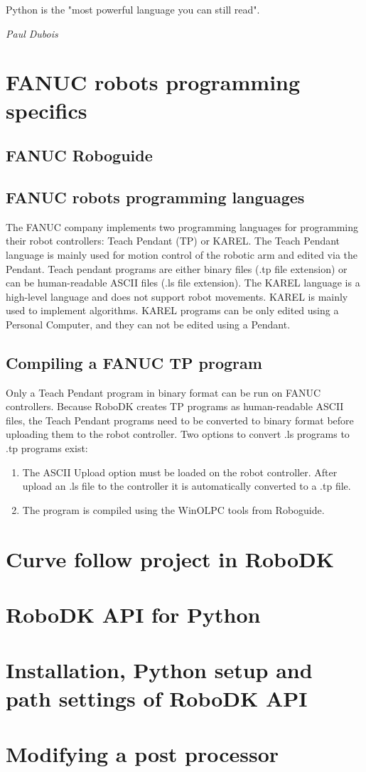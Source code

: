 \label{chap:implementation}

\epigraph{Python is the "most powerful language you can still read".}{\textit{Paul Dubois}}

\section{FANUC robots programming specifics}

\subsection{FANUC Roboguide}



\subsection{FANUC robots programming languages}

The FANUC company implements two programming languages for programming their robot controllers: Teach Pendant (TP) or KAREL. The Teach Pendant language is mainly used for motion control of the robotic arm and edited via the Pendant. Teach pendant programs are either binary files (.tp file extension) or can be human-readable ASCII files (.ls file extension). The KAREL language is a high-level language and does not support robot movements. KAREL is mainly used to implement algorithms. KAREL programs can be only edited using a Personal Computer, and they can not be edited using a Pendant.

\subsection{Compiling a FANUC TP program}

Only a Teach Pendant program in binary format can be run on FANUC controllers. Because RoboDK creates TP programs as human-readable ASCII files, the Teach Pendant programs need to be converted to binary format before uploading them to the robot controller. Two options to convert .ls programs to .tp programs exist:

\begin{enumerate}
\item The ASCII Upload option must be loaded on the robot controller. After upload an .ls file to the controller it is automatically converted to a .tp file.
\item The program is compiled using the WinOLPC tools from Roboguide.
\end{enumerate}

\section{Curve follow project in RoboDK}

\section{RoboDK API for Python}

\section{Installation, Python setup and path settings of RoboDK API}

\section{Modifying a post processor}


